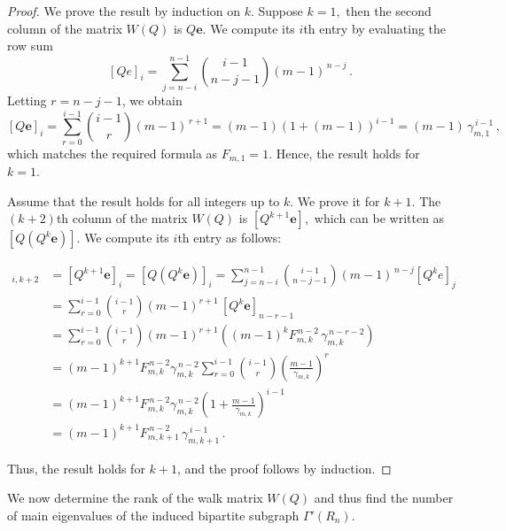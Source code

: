 \documentclass[11pt,oneside]{article}
\theoremstyle{plain}
\theoremstyle{plain}
\theoremstyle{definition}
\numberwithin{figure}{section}
\theoremstyle{remark}
\numberwithin{equation}{section}
\begin{document}
		\begin{proof}
			We prove the result by induction on $k$. Suppose $ k = 1,$ then the second column of the matrix $W(Q)$ is $Q\mathbf{e}.$  We compute its $i$th entry by evaluating the row sum
			\[
			[Qe]_i =  \sum_{j=n-i}^{n-1} \binom{i-1}{n-j-1}(m-1)^{\,n-j}\,.
			\]
			Letting $r = n - j -1$, we obtain
			$$
			[Q\mathbf{e}]_i 
			= \sum_{r=0}^{i-1} \binom{i-1}{r} (m-1)^{\,r+1} 
			= (m-1)\left(1+(m-1)\right)^{i-1} 
			=(m-1)  \, \gamma_{m,1}^{\,i-1}\,,
			$$
			which matches the required formula as $F_{m,1} = 1$. Hence, the result holds for $k = 1.$ 
			
			Assume that the result holds for all integers up to $k.$ We prove it for $k+1$. The $(k+2)$th column of the matrix $W(Q)$ is  $[Q^{k+1}\mathbf{e}],$ which can be written as $[Q(Q^k\mathbf{e})].$ We compute its $i$th entry as follows:
			
			\begin{align*}
				[W(Q)]_{i,k+2} &=  \left[ Q^{k+1} \mathbf{e} \right]_i = \left[ Q (Q^k \mathbf{e}) \right]_i
				=\sum_{j=n-i}^{n-1} \binom{i-1}{n-j-1}(m-1)^{\,n-j} [Q^k e]_j\\
				&= \sum_{r=0}^{i-1} \binom{i-1}{r} (m-1)^{r+1} \, \left[ Q^{k} \mathbf{e} \right]_{n-r-1}\\
				&= \sum_{r=0}^{i-1} \binom{i-1}{r} (m-1)^{r+1} \left((m-1)^k F_{m,k}^{\,n-2} \, \gamma_{m,k}^{\,n-r-2}
				\right)\\
				&= (m-1)^{k+1}F_{m,k}^{\,n-2} \gamma_{m,k}^{\,n-2}
				\sum_{r=0}^{i-1} \binom{i-1}{r} \left(\frac{m-1}{\gamma_{m,k}}\right)^{r}\\
				&= (m-1)^{k+1} F_{m,k}^{\,n-2} \gamma_{m,k}^{\,n-2}
				\left(1 + \frac{m-1}{\gamma_{m,k}}\right)^{i-1}\\
				& = (m-1)^{k+1} F_{m,k+1}^{\,n-2} \, \gamma_{m,k+1}^{\,i-1}\,.
			\end{align*}
			
			Thus, the result holds for $k+1$, and the proof follows by induction.
		\end{proof}
		
		
		\noindent
		We now determine the rank of the walk matrix $W(Q)$ and thus find the number of main eigenvalues of the induced bipartite subgraph $\Gamma'(R_n).$
		
\end{document}
